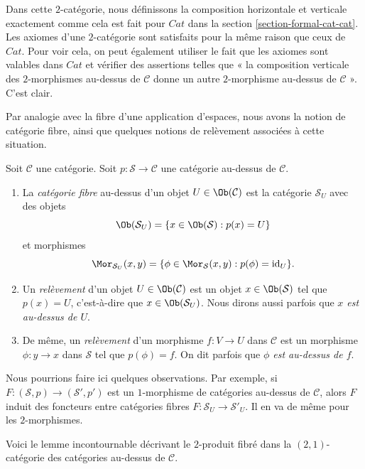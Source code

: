 \noindent
Dans cette $2$-catégorie, nous définissons la composition horizontale et
verticale exactement comme cela est fait pour $\textit{Cat}$ dans la section
\ref{section-formal-cat-cat}. Les axiomes d'une $2$-catégorie sont satisfaits
pour la même raison que ceux de $\textit{Cat}$. Pour voir cela, on peut
également utiliser le fait que les axiomes sont valables dans $\textit{Cat}$
et vérifier des assertions telles que « la composition verticale des
$2$-morphismes au-dessus de $\mathcal{C}$ donne un autre $2$-morphisme
au-dessus de $\mathcal{C}$ ». C'est
clair.

\medskip\noindent
Par analogie avec la fibre d'une application d'espaces, nous avons la
notion de catégorie fibre, ainsi que quelques notions de relèvement associées à
cette situation.

\begin{definition}
\label{definition-fibre-category}
Soit $\mathcal{C}$ une catégorie. Soit $p : \mathcal{S} \to \mathcal{C}$ une
catégorie au-dessus de $\mathcal{C}$.
\begin{enumerate}
\item La {\it catégorie fibre} au-dessus d'un objet $U\in \Ob(\mathcal{C})$ est la
catégorie $\mathcal{S}_U$ avec des objets
$$
\Ob(\mathcal{S}_U) = \{x\in \Ob(\mathcal{S}) :
p(x) = U\}
$$
et morphismes
$$
\Mor_{\mathcal{S}_U}(x, y) = \{ \phi \in \Mor_\mathcal{S}(x, y) :
p(\phi) = \text{id}_U\}.
$$
\item Un {\it relèvement} d'un objet $U \in \Ob(\mathcal{C})$ est un objet
$x\in \Ob(\mathcal{S})$ tel que $p(x) = U$, c'est-à-dire que $x\in \Ob(\mathcal{S}_U)$. Nous dirons aussi parfois que {\it $x$ est au-dessus de
$U$}.
\item De même, un {\it relèvement} d'un morphisme $f : V \to U$ dans $\mathcal{C}$
est un morphisme $\phi : y \to x$ dans $\mathcal{S}$ tel que $p(\phi) = f$. On
dit parfois que {\it $\phi$ est au-dessus de $f$}.
\end{enumerate}
\end{definition}

\noindent
Nous pourrions faire ici quelques observations. Par exemple, si $F : (\mathcal{S}, p) \to (\mathcal{S}', p')$ est un $1$-morphisme de catégories
au-dessus de $\mathcal{C}$, alors $F$ induit des foncteurs entre catégories
fibres $F : \mathcal{S}_U \to \mathcal{S}'_U$. Il en va de même pour les
$2$-morphismes.

\medskip\noindent
Voici le lemme incontournable décrivant le $2$-produit fibré dans la
$(2, 1)$-catégorie des catégories au-dessus de $\mathcal{C}$.

